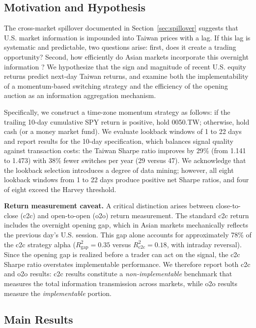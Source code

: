\subsection{Motivation and Hypothesis}

The cross-market spillover documented in Section~\ref{sec:spillover} suggests that U.S. market information is impounded into Taiwan prices with a lag. If this lag is systematic and predictable, two questions arise: first, does it create a trading opportunity? Second, how efficiently do Asian markets incorporate this overnight information \citep{barclay2003}? We hypothesize that the sign and magnitude of recent U.S. equity returns predict next-day Taiwan returns, and examine both the implementability of a momentum-based switching strategy and the efficiency of the opening auction as an information aggregation mechanism.

Specifically, we construct a time-zone momentum strategy as follows: if the trailing 10-day cumulative SPY return is positive, hold 0050.TW; otherwise, hold cash (or a money market fund). We evaluate lookback windows of 1 to 22 days and report results for the 10-day specification, which balances signal quality against transaction costs: the Taiwan Sharpe ratio improves by 29\% (from 1.141 to 1.473) with 38\% fewer switches per year (29 versus 47). We acknowledge that the lookback selection introduces a degree of data mining; however, all eight lookback windows from 1 to 22 days produce positive net Sharpe ratios, and four of eight exceed the Harvey threshold.

\textbf{Return measurement caveat.} A critical distinction arises between close-to-close (c2c) and open-to-open (o2o) return measurement. The standard c2c return includes the overnight opening gap, which in Asian markets mechanically reflects the previous day's U.S. session. This gap alone accounts for approximately 78\% of the c2c strategy alpha ($R^2_{\text{gap}} = 0.35$ versus $R^2_{\text{c2c}} = 0.18$, with intraday reversal). Since the opening gap is realized before a trader can act on the signal, the c2c Sharpe ratio overstates implementable performance. We therefore report both c2c and o2o results: c2c results constitute a \textit{non-implementable} benchmark that measures the total information transmission across markets, while o2o results measure the \textit{implementable} portion.

\subsection{Main Results}

